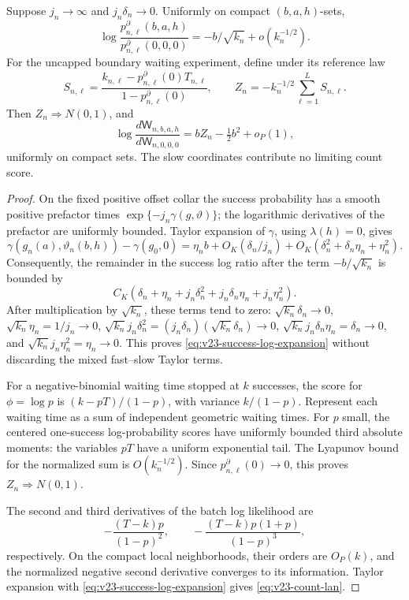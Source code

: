 \begin{lemma}
\label{lem:v23-negative-binomial-score}
Suppose \(j_n\to\infty\) and \(j_n\delta_n\to0\).  Uniformly on compact
\((b,a,h)\)-sets,
\begin{equation}\label{eq:v23-success-log-expansion}
 \log\frac{p^\partial_{n,\ell}(b,a,h)}
          {p^\partial_{n,\ell}(0,0,0)}
 =-b/\sqrt{k_n}+o(k_n^{-1/2}).
\end{equation}
For the uncapped boundary waiting experiment, define under its reference law
\[
 S_{n,\ell}=
 \frac{k_{n,\ell}-p^\partial_{n,\ell}(0)T_{n,\ell}}
      {1-p^\partial_{n,\ell}(0)},
 \qquad Z_n=-k_n^{-1/2}\sum_{\ell=1}^L S_{n,\ell}.
\]
Then \(Z_n\Rightarrow N(0,1)\), and
\begin{equation}\label{eq:v23-count-lan}
 \log\frac{d\mathsf W_{n,b,a,h}}{d\mathsf W_{n,0,0,0}}
 =bZ_n-\tfrac12b^2+o_P(1),
\end{equation}
uniformly on compact sets.  The slow coordinates contribute no limiting
count score.
\end{lemma}

\begin{proof}
On the fixed positive offset collar the success probability has a smooth
positive prefactor times \(\exp\{-j_n\gamma(g,\vartheta)\}\); the
logarithmic derivatives of the prefactor are uniformly bounded.  Taylor
expansion of \(\gamma\), using \(\lambda(h)=0\), gives
\[
 \gamma(g_n(a),\vartheta_n(b,h))-
 \gamma(g_0,0)
 =\eta_nb+O_K(\delta_n/j_n)
       +O_K(\delta_n^2+\delta_n\eta_n+\eta_n^2).
\]
Consequently, the remainder in the success log ratio after the term
\(-b/\sqrt{k_n}\) is bounded by
\[
 C_K(\delta_n+\eta_n+j_n\delta_n^2
                    +j_n\delta_n\eta_n+j_n\eta_n^2).
\]
After multiplication by \(\sqrt{k_n}\), these terms tend to zero:
\(\sqrt{k_n}\delta_n\to0\),
\(\sqrt{k_n}\eta_n=1/j_n\to0\),
\(\sqrt{k_n}j_n\delta_n^2
=(j_n\delta_n)(\sqrt{k_n}\delta_n)\to0\),
\(\sqrt{k_n}j_n\delta_n\eta_n=\delta_n\to0\), and
\(\sqrt{k_n}j_n\eta_n^2=\eta_n\to0\).
This proves \eqref{eq:v23-success-log-expansion} without discarding the mixed
fast--slow Taylor terms.

For a negative-binomial waiting time stopped at \(k\) successes, the score
for \(\phi=\log p\) is \((k-pT)/(1-p)\), with variance \(k/(1-p)\).
Represent each waiting time as a sum of independent geometric waiting times.
For \(p\) small, the centered one-success log-probability scores have
uniformly bounded third absolute moments: the variables \(pT\) have a
uniform exponential tail.  The Lyapunov bound for the normalized sum is
\(O(k_n^{-1/2})\).  Since \(p^\partial_{n,\ell}(0)\to0\), this proves
\(Z_n\Rightarrow N(0,1)\).

The second and third derivatives of the batch log likelihood are
\[
 -\frac{(T-k)p}{(1-p)^2},\qquad
 -\frac{(T-k)p(1+p)}{(1-p)^3},
\]
respectively.  On the compact local neighborhoods, their orders are
\(O_P(k)\), and the normalized negative second derivative converges to its
information.  Taylor expansion with
\eqref{eq:v23-success-log-expansion} gives \eqref{eq:v23-count-lan}.
\end{proof}

